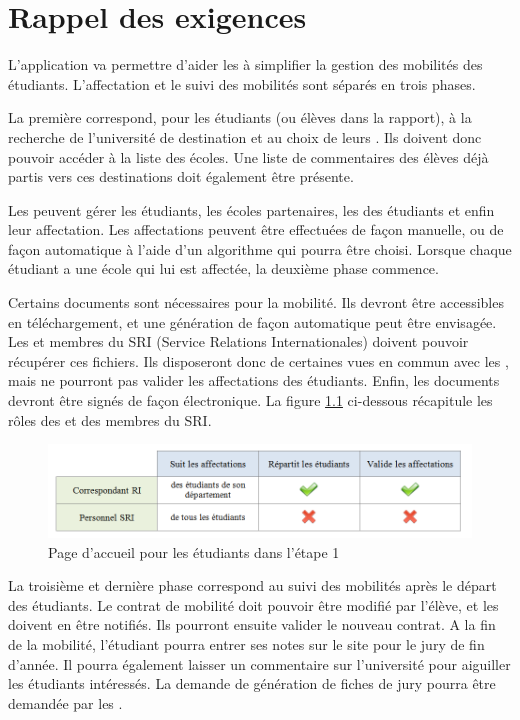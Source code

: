 \chapter{Rappel des exigences}
\label{chap::exigences}

L'application va permettre d'aider les \ris à simplifier la gestion des mobilités des étudiants. L'affectation et le suivi des mobilités sont séparés en trois phases. 

\bigbreak

La première correspond, pour les étudiants (ou élèves dans la rapport), à la recherche de l'université de destination et au choix de leurs \voe. Ils doivent donc pouvoir accéder à la liste des écoles. Une liste de commentaires des élèves déjà partis vers ces destinations doit également être présente.

Les \ris peuvent gérer les étudiants, les écoles partenaires, les \voe des étudiants et enfin leur affectation. Les affectations peuvent être effectuées de façon manuelle, ou de façon automatique à l'aide d'un algorithme qui pourra être choisi. Lorsque chaque étudiant a une école qui lui est affectée, la deuxième phase commence.
\bigbreak

Certains documents sont nécessaires pour la mobilité. Ils devront être accessibles en téléchargement, et une génération de façon automatique peut être envisagée. Les \ris et membres du SRI (Service Relations Internationales) doivent pouvoir récupérer ces fichiers. Ils disposeront donc de certaines vues en commun avec les \ris, mais ne pourront pas valider les affectations des étudiants. Enfin, les documents devront être signés de façon électronique. La figure \ref{fig::diffRI-SRI} ci-dessous récapitule les rôles des \ris et des membres du SRI.

\begin{figure}[H]
	\centering
	\includegraphics[scale=0.4]{roleRI-SRI.png}
	\caption{Page d'accueil pour les étudiants dans l'étape 1}
	\label{fig::diffRI-SRI}
\end{figure}
\bigbreak

La troisième et dernière phase correspond au suivi des mobilités après le départ des étudiants. Le contrat de mobilité doit pouvoir être modifié par l'élève, et les \ris doivent en être notifiés. Ils pourront ensuite valider le nouveau contrat. A la fin de la mobilité, l'étudiant pourra entrer ses notes sur le site pour le jury de fin d'année. Il pourra également laisser un commentaire sur l'université pour aiguiller les étudiants intéressés. La demande de génération de fiches de jury pourra être demandée par les \ris.